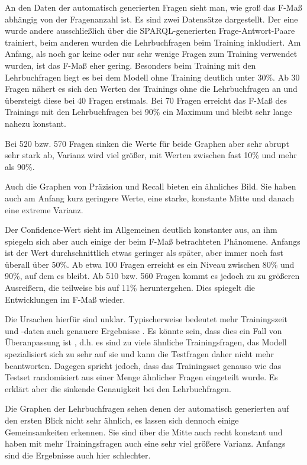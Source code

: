 \documentclass[utf8,biblatex]{lni}
\begin{document}
An den Daten der automatisch generierten Fragen sieht man, wie groß das F-Maß abhängig von der Fragenanzahl ist.
Es sind zwei Datensätze dargestellt.
Der eine wurde andere ausschließlich über die SPARQL-generierten Frage-Antwort-Paare trainiert, beim anderen wurden die Lehrbuchfragen beim Training inkludiert.
Am Anfang, als noch gar keine oder nur sehr wenige Fragen zum Training verwendet wurden, ist das F-Maß eher gering.
Besonders beim Training mit den Lehrbuchfragen liegt es bei dem Modell ohne Training deutlich unter 30\%.
Ab 30 Fragen nähert es sich den Werten des Trainings ohne die Lehrbuchfragen an und übersteigt diese bei 40 Fragen erstmals.
Bei 70 Fragen erreicht das F-Maß des Trainings mit den Lehrbuchfragen bei 90\% ein Maximum und bleibt sehr lange nahezu konstant.

Bei 520 bzw. 570 Fragen sinken die Werte für beide Graphen aber sehr abrupt sehr stark ab, Varianz wird viel größer,
mit Werten zwischen fast 10\% und mehr als 90\%.

Auch die Graphen von Präzision und Recall bieten ein ähnliches Bild.
Sie haben auch am Anfang kurz geringere Werte, eine starke, konstante Mitte und danach eine extreme Varianz.

Der Confidence-Wert sieht im Allgemeinen deutlich konstanter aus, an ihm spiegeln sich aber auch einige der beim F-Maß betrachteten Phänomene.
Anfangs ist der Wert durchschnittlich etwas geringer als später, aber immer noch fast überall über 50\%.
Ab etwa 100 Fragen erreicht es ein Niveau zwischen 80\% und 90\%, auf dem es bleibt.
Ab 510 bzw. 560 Fragen kommt es jedoch zu zu größeren Ausreißern, die teilweise bis auf 11\% heruntergehen.
Dies spiegelt die Entwicklungen im F-Maß wieder.

Die Ursachen hierfür sind unklar.
Typischerweise bedeutet mehr Trainingszeit und -daten auch genauere Ergebnisse \cite{lernkurve}.
Es könnte sein, dass dies ein Fall von Überanpassung ist \cite{overunderfitting}, d.h. es sind zu viele ähnliche Trainingsfragen,
das Modell spezialisiert sich zu sehr auf sie und kann die Testfragen daher nicht mehr beantworten.
Dagegen spricht jedoch, dass das Trainingsset genauso wie das Testset randomisiert aus einer Menge ähnlicher Fragen eingeteilt wurde.
Es erklärt aber die sinkende Genauigkeit bei den Lehrbuchfragen.

Die Graphen der Lehrbuchfragen sehen denen der automatisch generierten auf den ersten Blick nicht sehr ähnlich,
es lassen sich dennoch einige Gemeinsamkeiten erkennen.
Sie sind über die Mitte auch recht konstant und haben mit mehr Trainingsfragen auch eine sehr viel größere Varianz.
Anfangs sind die Ergebnisse auch hier schlechter.
\end{document}
